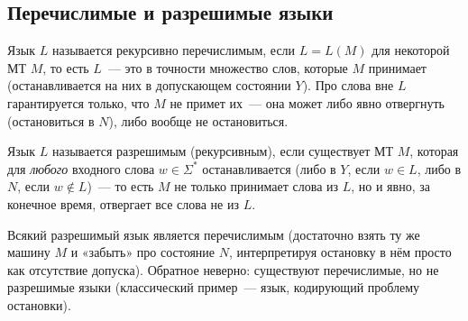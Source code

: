 \documentclass[12pt]{article}
\begin{document}
    \subsection{Перечислимые и разрешимые языки}
    
    \begin{definition}
    	Язык $L$ называется рекурсивно перечислимым, если $L = L(M)$ для некоторой МТ $M$, то есть $L$~--- это в точности множество слов, которые $M$ принимает (останавливается на них в допускающем состоянии $Y$). Про слова вне $L$ гарантируется только, что $M$ не примет их~--- она может либо явно отвергнуть (остановиться в $N$), либо вообще не остановиться.
    \end{definition}
    
    \begin{definition}
    	Язык $L$ называется разрешимым (рекурсивным), если существует МТ $M$, которая для \emph{любого} входного слова $w \in \Sigma^*$ останавливается (либо в $Y$, если $w \in L$, либо в $N$, если $w \notin L$)~--- то есть $M$ не только принимает слова из $L$, но и явно, за конечное время, отвергает все слова не из $L$.
    \end{definition}
    
    \begin{statement}
    	Всякий разрешимый язык является перечислимым (достаточно взять ту же машину $M$ и «забыть» про состояние $N$, интерпретируя остановку в нём просто как отсутствие допуска). Обратное неверно: существуют перечислимые, но не разрешимые языки (классический пример~--- язык, кодирующий проблему остановки).
    \end{statement}
\end{document}
